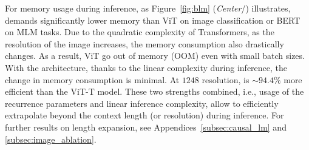 For memory usage during inference,
as Figure~\ref{fig:blm} (\textit{Center}/) illustrates, \lions demands significantly lower memory than ViT on image classification or BERT on MLM tasks.
Due to the quadratic complexity of Transformers, as the resolution of the image increases, the memory consumption also drastically changes.
As a result, ViT  go out of memory (OOM) even with small batch sizes. With the \lions architecture, thanks to the linear complexity during inference, the change in memory consumption is minimal. At $1248$ resolution, \lions is $\sim 94.4\%$ more efficient than the ViT-T model. 
These two strengths combined, i.e., usage of the recurrence parameters and linear inference complexity, allow \lions to efficiently extrapolate beyond the context length (or resolution) during inference. For further results on length expansion, see Appendices~\ref{subsec:causal_lm} and \ref{subsec:image_ablation}. 



